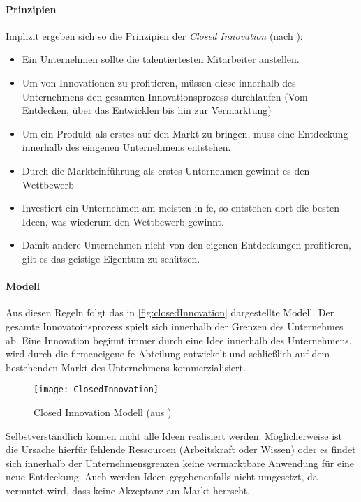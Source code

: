 \paragraph{Prinzipien}
Implizit ergeben sich so die Prinzipien der \textit{Closed Innovation} (nach \cite[19]{herzog2011}):
\begin{itemize}
    \item Ein Unternehmen sollte die talentiertesten Mitarbeiter anstellen.
    \item Um von Innovationen zu profitieren, müssen diese innerhalb des Unternehmens den gesamten Innovationsprozess durchlaufen (Vom Entdecken, über das Entwicklen bis hin zur Vermarktung)
    \item Um ein Produkt als erstes auf den Markt zu bringen, muss eine Entdeckung innerhalb des eingenen Unternehmens entstehen.
    \item Durch die Markteinführung als erstes Unternehmen gewinnt es den Wettbewerb
    \item Investiert ein Unternehmen am meisten in \ac{fe}, so entstehen dort die besten Ideen, was wiederum den Wettbewerb gewinnt.
    \item Damit andere Unternehmen nicht von den eigenen Entdeckungen profitieren, gilt es das geistige Eigentum zu schützen.
\end{itemize}

\paragraph{Modell}
Aus diesen Regeln folgt das in \autoref{fig:closedInnovation} dargestellte Modell.
Der gesamte Innovatoinsprozess spielt sich innerhalb der Grenzen des Unternehmes ab.
Eine Innovation beginnt immer durch eine Idee innerhalb des Unternehmens,
wird durch die firmeneigene \ac{fe}-Abteilung entwickelt
und schließlich auf dem bestehenden Markt des Unternehmens kommerzialisiert.

\begin{figure}[ht!]
    \centering
    \texttt{[image: ClosedInnovation]}
    \caption{Closed Innovation Modell (aus \cite[20]{herzog2011})}
    \label{fig:closedInnovation}
\end{figure}

Selbstverständlich können nicht alle Ideen realisiert werden.
Möglicherweise ist die Ursache hierfür fehlende Ressourcen (Arbeitskraft oder Wissen)
oder es findet sich innerhalb der Unternehmensgrenzen keine vermarktbare Anwendung für eine neue Entdeckung.
Auch werden Ideen gegebenenfalls nicht umgesetzt, da vermutet wird, dass keine Akzeptanz am Markt herrscht.

